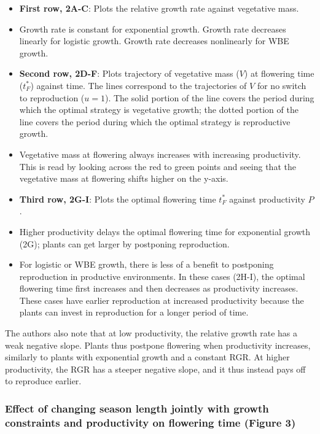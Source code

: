 \documentclass[12pt, oneside]{article}   	%
\begin{document}
\begin{itemize}

\item \textbf{First row, 2A-C}: Plots the relative growth rate against vegetative mass.
\item Growth rate is constant for exponential growth. Growth rate decreases linearly for logistic growth. Growth rate decreases nonlinearly for WBE growth.
\item \textbf{Second row, 2D-F}: Plots trajectory of vegetative mass ($V$) at flowering time ($t^*_F$) against time. The lines correspond to the trajectories of $V$ for no switch to reproduction ($u=1$). The solid portion of the line covers the period during which the optimal strategy is vegetative growth; the dotted portion of the line covers the period during which the optimal strategy is reproductive growth.
\item Vegetative mass at flowering always increases with increasing productivity. This is read by looking across the red to green points and seeing that the vegetative mass at flowering shifts higher on the y-axis. 
\item \textbf{Third row, 2G-I}: Plots the optimal flowering time $t^*_F$ against productivity $P$.
\item Higher productivity delays the optimal flowering time for exponential growth (2G); plants can get larger by postponing reproduction.
\item For logistic or WBE growth, there is less of a benefit to postponing reproduction in productive environments. In these cases (2H-I), the optimal flowering time first increases and then decreases as productivity increases. These cases have earlier reproduction at increased productivity because the plants can invest in reproduction for a longer period of time.
\end{itemize}

The authors also note that at low productivity, the relative growth rate has a weak negative slope. Plants thus postpone flowering when productivity increases, similarly to plants with exponential growth and a constant RGR. At higher productivity, the RGR has a steeper negative slope, and it thus instead pays off to reproduce earlier.

\subsubsection{Effect of changing season length jointly with growth constraints and productivity on flowering time (Figure 3)}
\end{document}
